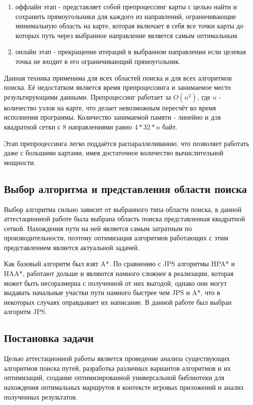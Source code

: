 \begin{enumerate}
	\item оффлайн этап - представляет собой препроцессинг карты с целью найти и сохранить прямоугольники для каждого из направлений, ограничивающие минимальную область на карте, которая включает в себя все точки карты до которых путь через выбранное направление является самым оптимальным.
	\item онлайн этап - прекращение итераций в выбранном направлении если целевая точка не входит в его ограничивающий прямоугольник.
\end{enumerate}
 
Данная техника применима для всех областей поиска и для всех алгоритмов поиска. Её недостатком является время препроцессинга и занимаемое место результирующими данными. Препроцессинг работает за $O(n^2)$, где $n$ - количество узлов на карте, что делает невозможным пересчёт во время исполнения программы. Количество занимаемой памяти - линейно и для квадратной сетки с 8 направлениями равно $ 4 * 32 * n$ байт.

Этап препроцессинга легко поддаётся распараллеливанию, что позволяет работать даже с большими картами, имея достаточное количество вычислительной мощности.  

\subsection{Выбор алгоритма и представления области поиска}

Выбор алгоритма сильно зависит от выбранного типа области поиска, в данной аттестационной работе была выбрана область поиска представленная квадратной сеткой. Нахождения пути на ней является самым затратным по производительности, поэтому оптимизация алгоритмов работающих с этим представлением является актуальной задачей. 

Как базовый алгоритм был взят A*. По сравнению с JPS алгоритмы HPA* и HAA*, работают дольше и являются намного сложнее в реализации, которая может быть несоразмерна с полученной от них выгодой, однако они могут выдавать начальные участки пути намного быстрее чем JPS и A*, что в некоторых случаях оправдывает их написание. В данной работе был выбран алгоритм JPS.  


\subsection{Постановка задачи}

Целью аттестационной работы является проведение анализа существующих алгоритмов поиска путей, разработка различных вариантов алгоритмов и их оптимизаций, создание оптимизированной универсальной библиотеки для нахождения оптимальных маршрутов в контексте игровых приложений и анализ полученных результатов. 


